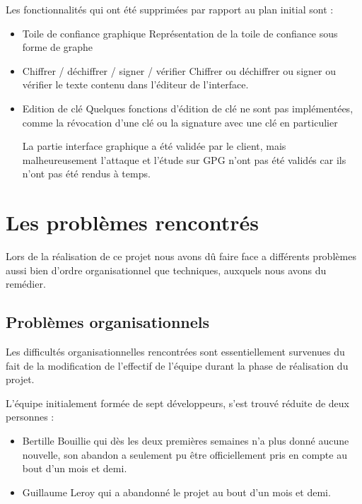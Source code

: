 \documentclass{../res/univ-projet}
\begin{document}
  

  Les fonctionnalités qui ont été supprimées par rapport au plan initial sont :\medbreak
  \begin{itemize}
  \item Toile de confiance graphique\smallbreak
  Représentation de la toile de confiance sous forme de graphe\smallbreak
  \item Chiffrer / déchiffrer / signer / vérifier \smallbreak
  Chiffrer ou déchiffrer ou signer ou vérifier le texte contenu dans l'éditeur de l'interface.\smallbreak
  \item Edition de clé \smallbreak
  Quelques fonctions d'édition de clé ne sont pas implémentées, comme la révocation d'une clé ou la signature avec une clé en particulier \smallbreak 
  

  La partie interface graphique a été validée par le client, mais malheureusement l'attaque et l'étude sur GPG n'ont pas été validés car ils n'ont pas été rendus à temps.

  \end{itemize}

\section{Les problèmes rencontrés}

  Lors de la réalisation de ce projet nous avons dû faire face a
  différents problèmes aussi bien d'ordre organisationnel que techniques,
  auxquels nous avons du remédier.

  \subsection{Problèmes organisationnels}

    Les difficultés organisationnelles rencontrées sont essentiellement
    survenues du fait de la modification de l'effectif de l'équipe durant la
    phase de réalisation du projet. 

    L'équipe initialement formée de sept développeurs,
    s'est trouvé réduite de deux personnes :
    \begin{itemize}
      \item Bertille Bouillie qui dès les deux premières semaines n'a plus donné
      aucune nouvelle, son abandon a seulement pu être officiellement pris en compte au bout d'un mois et demi.
      \item Guillaume Leroy qui a abandonné le projet au bout d'un mois et demi.
    \end{itemize}
\end{document}
